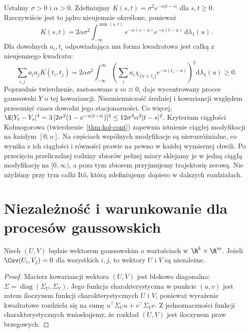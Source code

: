 \begin{przyklad}
Ustalmy $\sigma>0$ i $\alpha>0$. Zdefiniujmy
$K(s,t)=\sigma^2 e^{-\alpha|t-s|}$ dla $s,t\ge0$.
Rzeczywiście jest to jądro nieujemnie określone, ponieważ
\[
K(s,t)=2\alpha\sigma^2\int_{-\infty}^{\min(s,t)}
 e^{-\alpha(s-u)}e^{-\alpha(t-u)}\,\mathrm d\lambda_1(u).
\]
Dla dowolnych $a_i,t_i$ odpowiadająca mu forma kwadratowa jest
całką z nieujemnego kwadratu:
\[
\sum_{i,j}a_ia_jK(t_i,t_j)=2\alpha\sigma^2\int_{-\infty}^\infty
\left(\sum_i a_i\chi_{\{u\le t_i\}}e^{-\alpha(t_i-u)}\right)^2\mathrm d\lambda_1(u)\ge0.
\]
Poprzednie twierdzenie, zastosowane z $m\equiv0$, daje
wycentrowany proces gaussowski $Y$ o tej kowariancji.
Niezmienniczość średniej i kowariancji względem przesunięć
czasu dowodzi jego stacjonarności. Co więcej,
$\E|Y_t-Y_s|^4=3\,[2\sigma^2(1-e^{-\alpha|t-s|})]^2
\le12\sigma^4\alpha^2|t-s|^2$.
Kryterium ciągłości Kołmogorowa
(twierdzenie~\ref{thm:kol-cont}) zapewnia istnienie ciągłej
modyfikacji na każdym $[0,n]$. Na częściach wspólnych
modyfikacje są nierozróżnialne, co wynika z ich ciągłości
i równości prawie na pewno w każdej wymiernej chwili.
Po przecięciu przeliczalnej rodziny zbiorów pełnej miary
sklejamy je w jedną ciągłą modyfikację na $[0,\infty)$,
a poza tym zbiorem przyjmujemy trajektorię zerową. Nie użyliśmy przy tym całki Itô, którą zdefiniujemy
dopiero w dalszych rozdziałach.
\end{przyklad}

\section{Niezależność i warunkowanie dla procesów gaussowskich}
\begin{twierdzenie}
Niech $(U,V)$ będzie wektorem gaussowskim o wartościach
w $\R^k\times\R^m$. Jeżeli $\Cov(U_i,V_j)=0$
dla wszystkich $i,j$, to wektory $U$ i $V$ są niezależne.
\end{twierdzenie}
\begin{proof}
Macierz kowariancji wektora $(U,V)$ jest blokowo diagonalna:
$\Sigma=\operatorname{diag}(\Sigma_U,\Sigma_V)$.
Jego funkcja charakterystyczna w punkcie $(u,v)$ jest zatem
iloczynem funkcji charakterystycznych $U$ i $V$,
ponieważ wyrażenie kwadratowe rozdziela się na sumę
$u^\top\Sigma_Uu+v^\top\Sigma_Vv$.
Z jednoznaczności funkcji charakterystycznych wnioskujemy,
że rozkład $(U,V)$ jest iloczynem praw brzegowych.
\end{proof}

